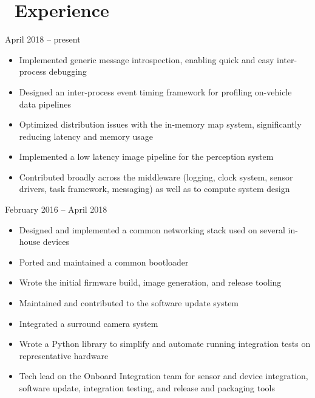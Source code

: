 \documentclass{resume}
\begin{document}

 
\section{\faWrench\ Experience}
          {April 2018 -- present}
\begin{itemize}
  \item Implemented generic message introspection, enabling quick and easy inter-process debugging
  \item Designed an inter-process event timing framework for profiling on-vehicle data pipelines
  \item Optimized distribution issues with the in-memory map system, significantly reducing latency and memory usage
  \item Implemented a low latency image pipeline for the perception system
  \item Contributed broadly across the middleware (logging, clock system, sensor drivers, task framework, messaging) as well as to compute system design
\end{itemize}
\vspace{3mm}

          {February 2016 -- April 2018}
\begin{itemize}
  \item Designed and implemented a common networking stack used on several in-house devices
  \item Ported and maintained a common bootloader
  \item Wrote the initial firmware build, image generation, and release tooling
  \item Maintained and contributed to the software update system
  \item Integrated a surround camera system
  \item Wrote a Python library to simplify and automate running integration tests on representative hardware
  \item Tech lead on the Onboard Integration team for sensor and device integration,
      software update, integration testing, and release and packaging tools
\end{itemize}
\vspace{3mm}
\end{document}
